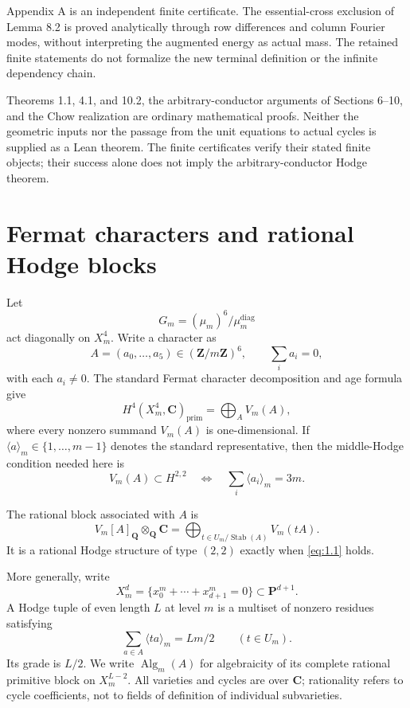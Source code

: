 \documentclass[11pt]{amsart}
\numberwithin{theorem}{section}
\theoremstyle{remark}
\numberwithin{equation}{section}
\begin{document}
Appendix A is an independent finite certificate. The essential-cross
exclusion of Lemma 8.2 is proved analytically through row differences
and column Fourier modes, without interpreting the augmented energy
as actual mass. The retained finite statements do not formalize the
new terminal definition or the infinite dependency chain.

Theorems 1.1, 4.1, and 10.2, the arbitrary-conductor arguments of
Sections 6--10, and the Chow realization are ordinary mathematical
proofs. Neither the geometric inputs nor the passage from the unit
equations to actual cycles is supplied as a Lean theorem. The finite
certificates verify their stated finite objects; their success alone
does not imply the arbitrary-conductor Hodge theorem.

\section{Fermat characters and rational Hodge blocks}\label{sec:2}

Let
\[
G_m=(\mu_m)^6/\mu_m^{\mathrm{diag}}
\]
act diagonally on \(X_m^4\). Write a character as
\[
A=(a_0,\ldots,a_5)\in (\mathbf Z/m\mathbf Z)^6,
\qquad \sum_i a_i=0,
\]
with each \(a_i\ne0\). The standard Fermat character decomposition and age
formula \cite[p.~385]{aoki1987} give
\[
H^4(X_m^4,\mathbf C)_{\mathrm{prim}}
=\bigoplus_A V_m(A),
\tag{2.1}\label{eq:2.1}
\]
where every nonzero summand \(V_m(A)\) is one-dimensional. If
\(\langle a\rangle_m\in\{1,\ldots,m-1\}\) denotes the standard representative,
then the middle-Hodge condition needed here is
\[
V_m(A)\subset H^{2,2}
\quad\Longleftrightarrow\quad
\sum_i\langle a_i\rangle_m=3m.
\tag{2.2}\label{eq:2.2}
\]

The rational block associated with \(A\) is
\[
V_m[A]_{\mathbf Q}\otimes_{\mathbf Q}\mathbf C
=\bigoplus_{t\in U_m/\operatorname{Stab}(A)}V_m(tA).
\tag{2.3}\label{eq:2.3}
\]
It is a rational Hodge structure of type \((2,2)\) exactly when \eqref{eq:1.1} holds.

More generally, write
\[
X_m^d=\{x_0^m+\cdots+x_{d+1}^m=0\}\subset\mathbf P^{d+1}.
\]
A Hodge tuple of even length \(L\) at level \(m\) is a multiset of
nonzero residues satisfying
\[
\sum_{a\in A}\langle ta\rangle_m=Lm/2\qquad(t\in U_m).
\tag{1}\label{eq:1}
\]
Its grade is \(L/2\). We write \(\operatorname{Alg}_m(A)\) for
algebraicity of its complete rational primitive block on \(X_m^{L-2}\).
All varieties and cycles are over \(\mathbf C\); rationality refers to
cycle coefficients, not to fields of definition of individual subvarieties.
\end{document}
